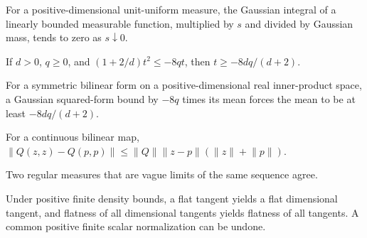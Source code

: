 \begin{lemma}
\label{lem:uniform-gaussian-linear-growth-limit}

For a positive-dimensional unit-uniform measure, the Gaussian integral of a linearly bounded measurable function, multiplied by $s$ and divided by Gaussian mass, tends to zero as $s\downarrow0$.
\end{lemma}

\begin{lemma}
\label{lem:quadratic-square-upper-lower}

If $d>0$, $q\ge0$, and $(1+2/d)t^2\le-8qt$, then $t\ge-8dq/(d+2)$.
\end{lemma}

\begin{lemma}
\label{lem:gaussian-square-upper-trace-lower}

For a symmetric bilinear form on a positive-dimensional real inner-product space, a Gaussian squared-form bound by $-8q$ times its mean forces the mean to be at least $-8dq/(d+2)$.
\end{lemma}

\begin{lemma}
\label{lem:bilinear-diagonal-difference}

For a continuous bilinear map, $\lVert Q(z,z)-Q(p,p)\rVert\le\lVert Q\rVert\lVert z-p\rVert(\lVert z\rVert+\lVert p\rVert)$.
\end{lemma}

\begin{lemma}
\label{lem:vague-limit-unique}

Two regular measures that are vague limits of the same sequence agree.
\end{lemma}

\begin{lemma}
\label{lem:flat-tangent-normalization}

Under positive finite density bounds, a flat tangent yields a flat dimensional tangent, and flatness of all dimensional tangents yields flatness of all tangents. A common positive finite scalar normalization can be undone.
\end{lemma}

